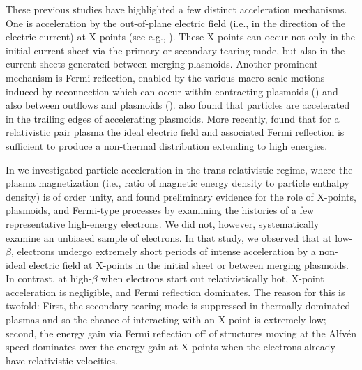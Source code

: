 These previous studies have highlighted a few distinct acceleration mechanisms.  One is acceleration by the out-of-plane electric field (i.e., in the direction of the electric current) at X-points (see e.g., \citealt{zenitani2001, sironi2014, nalewajko2015}).  These X-points can occur not only in the initial current sheet via the primary or secondary tearing mode, but also in the current sheets generated between merging plasmoids.  Another prominent mechanism is Fermi reflection, enabled by the various macro-scale motions induced by reconnection which can occur within contracting plasmoids (\citealt{drake2006}) and also between outflows and plasmoids (\citealt{ball2018}).  \citet{nalewajko2015} also found that particles are accelerated in the trailing edges of accelerating plasmoids.  More recently, \citet{guo2019} found that for a relativistic pair plasma the ideal electric field and associated Fermi reflection is sufficient to produce a non-thermal distribution extending to high energies.

In \citet{ball2018} we investigated particle acceleration in the trans-relativistic regime, where the plasma magnetization (i.e., ratio of magnetic energy density to particle enthalpy density) is of order unity,  and found preliminary evidence for the role of X-points, plasmoids, and Fermi-type processes by examining the histories of a few representative high-energy electrons.  We did not, however, systematically examine an unbiased sample of electrons.  In that study, we observed that at low-$\beta$, electrons undergo extremely short periods of intense acceleration by a non-ideal electric field at X-points in the initial sheet or between merging plasmoids.  In contrast, at high-$\beta$ when electrons start out relativistically hot, X-point acceleration is negligible, and Fermi reflection dominates.  The reason for this is twofold: First, the secondary tearing mode is suppressed in thermally dominated plasmas and so the chance of interacting with an X-point is extremely low; second, the energy gain via Fermi reflection off of structures moving at the Alfv\'en speed dominates over the energy gain at X-points when the electrons already have relativistic velocities.

